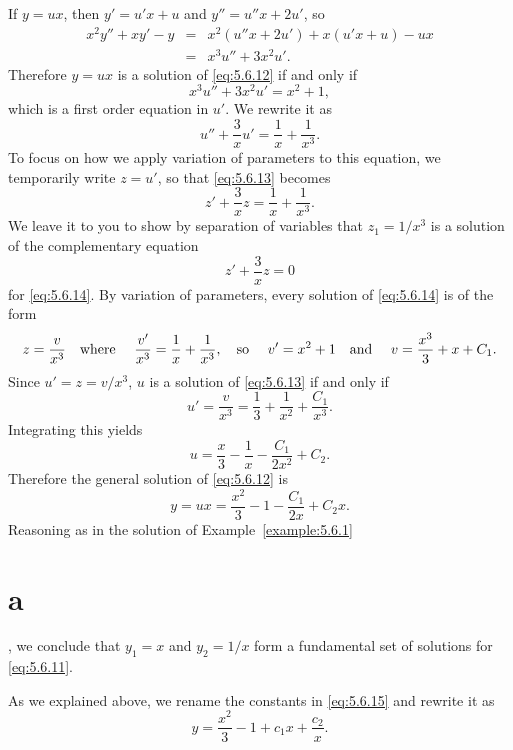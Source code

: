 \begin{examplesolution}
 If $y=ux$, then $y'=u'x+u$ and $y''=u''x+2u'$, so
\begin{eqnarray*}
  x^{2}y''+xy'-y & = & x^{2}(u''x+2u')+x(u'x+u)-ux \\
                 & = & x^{3}u''+3x^{2}u'.
\end{eqnarray*}
Therefore $y=ux$ is a solution of \eqref{eq:5.6.12} if and only if
\[
  x^{3}u''+3x^{2}u'=x^{2}+1,
\]
which is a first order equation in $u'$. We rewrite it as
\begin{equation}
  \label{eq:5.6.13}u''+\frac{3}{x}u'=\frac{1}{x}+\frac{1}{x^{3}}.
\end{equation}
To focus on how we apply variation of parameters to this equation, we temporarily write $z=u'$, so
that \eqref{eq:5.6.13} becomes
\begin{equation}
  \label{eq:5.6.14}z'+\frac{3}{x}z=\frac{1}{x}+\frac{1}{x^{3}}.
\end{equation}
We leave it to you to show by separation of variables that $z_{1}=1/x^{3}$ is a solution of the
complementary equation
\[
  z'+\frac{3}{x}z=0
\]
for \eqref{eq:5.6.14}. By variation of parameters, every solution of \eqref{eq:5.6.14} is of the
form
\[
  z=\frac{v}{x^{3}}\mbox{\quad where \quad}{\frac{v'}{x^{3}}}=\frac{1}{x}+\frac{1}{x^{3}},\mbox{\quad so \quad}v'=x^{2}+1\mbox{\quad and \quad}v=\frac{x^{3}}{3}+x+C_{1}.
\]
Since $u'=z=v/x^{3}$, $u$ is a solution of \eqref{eq:5.6.13} if and only if
\[
  u'=\frac{v}{x^{3}}=\frac{1}{3}+\frac{1}{x^{2}}+\frac{C_{1}}{x^{3}}.
\]
Integrating this yields
\[
  u=\frac{x}{3}-\frac{1}{x}-\frac{C_{1}}{2x^{2}}+C_{2}.
\]
Therefore the general solution of \eqref{eq:5.6.12} is
\begin{equation}
  \label{eq:5.6.15}y=ux=\frac{x^{2}}{3}-1-\frac{C_{1}}{2x}+C_{2}x.
\end{equation}
Reasoning as in the solution of Example~\ref{example:5.6.1}\part{a}, we conclude that $y_{1}=x$ and
$y_{2}=1/x$ form a fundamental set of solutions for \eqref{eq:5.6.11}.

As we explained above, we rename the constants in \eqref{eq:5.6.15} and rewrite it as
\begin{equation}
  \label{eq:5.6.16}y=\frac{x^{2}}{3}-1+c_{1}x+\frac{c_{2}}{x}.
\end{equation}


\end{examplesolution}
